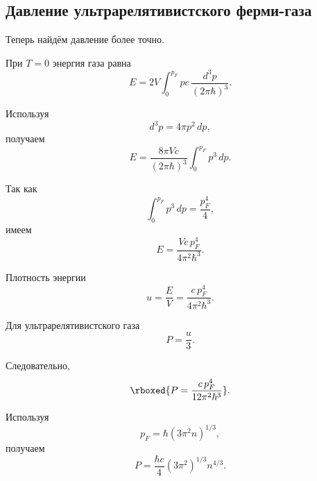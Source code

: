 \documentclass[../final.tex]{subfiles}
\begin{document}

\subsection*{Давление ультрарелятивистского ферми-газа}

Теперь найдём давление более точно.

При $T=0$ энергия газа равна
%
\begin{equation*}
    E
    =
    2V
    \int_0^{p_F}
    pc\,
    \frac{d^3p}{(2\pi\hbar)^3}.
\end{equation*}

Используя
%
\begin{equation*}
    d^3p
    =
    4\pi p^2\,dp,
\end{equation*}
%
получаем
%
\begin{equation*}
    E
    =
    \frac{8\pi Vc}{(2\pi\hbar)^3}
    \int_0^{p_F}
    p^3\,dp.
\end{equation*}

Так как
%
\begin{equation*}
    \int_0^{p_F}
    p^3\,dp
    =
    \frac{p_F^4}{4},
\end{equation*}
%
имеем
%
\begin{equation*}
    E
    =
    \frac{Vc\,p_F^4}{4\pi^2\hbar^3}.
\end{equation*}

Плотность энергии
%
\begin{equation*}
    u
    =
    \frac{E}{V}
    =
    \frac{c\,p_F^4}{4\pi^2\hbar^3}.
\end{equation*}

Для ультрарелятивистского газа
%
\begin{equation*}
    P
    =
    \frac{u}{3}.
\end{equation*}

Следовательно,
%
\begin{equation*}
    \rboxed{
        P
        =
        \frac{c\,p_F^4}
        {12\pi^2\hbar^3}
    }.
\end{equation*}

Используя
%
\begin{equation*}
    p_F
    =
    \hbar
    (3\pi^2n)^{1/3},
\end{equation*}
%
получаем
%
\begin{equation*}
    P
    =
    \frac{\hbar c}{4}
    (3\pi^2)^{1/3}
    n^{4/3}.
\end{equation*}
\end{document}
